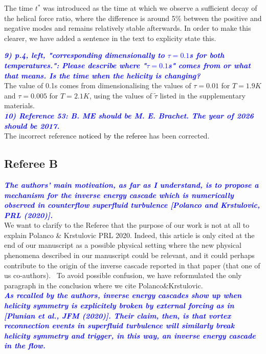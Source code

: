 \documentclass[a4paper,10pt]{article}
\def\red#1{\textcolor{black}{#1}}
\def\blue#1{\textcolor{blue}{#1}}
\def\refcomment#1{\textbf{\blue{\emph{#1}}}\\}
\begin{document}
    The time $t^*$ was introduced as the time at which we observe a sufficient decay of the helical force ratio, where the difference is around 5\% between the positive and negative modes and remains relatively stable afterwards. In order to make this clearer, we have added a sentence in the text to explicity state this.

    \refcomment{9) p.4, left, "corresponding dimensionally to $\tau = 0.1$s for both
    temperatures.": Please describe where "$\tau = 0.1$s" comes from or what
    that means. Is the time when the helicity is changing?}
    
    The value of 0.1s comes from dimensionalising the values of $\tau=0.01$ for $T=1.9K$ and $\tau=0.005$ for $T=2.1K$, using the values of $\tilde{\tau}$ listed in the supplementary materials. \\
    
    \refcomment{10) Reference 53: B. ME should be M. E. Brachet. The year of 2026
    should be 2017.}

    The incorrect reference \red{noticed by the referee} has been
    corrected.\\




\newpage
\subsection*{Referee B}

\refcomment{The authors’ main motivation, as far as I understand, is to propose a mechanism for the inverse energy cascade which is numerically observed in counterflow superfluid turbulence [Polanco and Krstulovic, PRL (2020)].}

We want to clarify to the Referee that the purpose of our work is not 
at all to explain Polanco \& Krstulovic PRL 2020. Indeed, this
 article is only cited at the end of our manuscript as a possible physical 
setting where the new physical phenomena described in our manuscript 
could be relevant, and it could perhaps contribute to the origin of 
the inverse cascade reported in that paper (that one of us co-authors).  
To avoid possible confusion, we have reformulated the only paragraph 
in the conclusion where we cite Polanco\&Krstulovic.\\

\refcomment{As recalled by the authors, inverse energy cascades show up when helicity symmetry is explicitely broken by external forcing as in [Plunian et al., JFM (2020)]. Their claim, then, is that vortex reconnection events in superfluid turbulence will similarly break helicity symmetry and trigger, in this way, an inverse energy cascade in the flow.}
\end{document}
